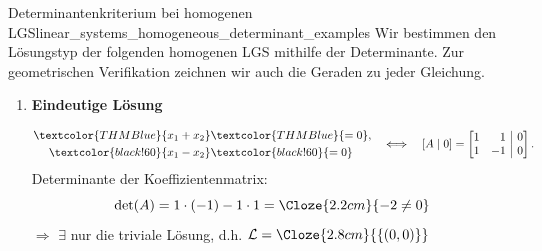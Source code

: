 \begin{ExampleBox}{Determinantenkriterium bei homogenen LGS}{linear_systems_homogeneous_determinant_examples}
  Wir bestimmen den Lösungstyp der folgenden homogenen LGS mithilfe der
  Determinante. Zur geometrischen Verifikation zeichnen wir auch die Geraden
  zu jeder Gleichung.

  \begin{enumerate}[label=\alph*),leftmargin=1.8em,itemsep=1.5em]
    \item
      \textbf{Eindeutige Lösung}\par
      \noindent
      \begin{minipage}[c]{0.61\linewidth}
        \vspace{-0.45\baselineskip}
        \[
          \begin{aligned}
            \textcolor{THMBlue}{x_1+x_2}&\textcolor{THMBlue}{=0},\\
            \textcolor{black!60}{x_1-x_2}&\textcolor{black!60}{=0}
          \end{aligned}
          \quad\Longleftrightarrow\quad
          [A\mid 0]=
          \left[
            \begin{array}{@{}rr|r@{}}
              1& 1&0\\
              1&-1&0
            \end{array}
          \right].
        \]
        \noindent
        Determinante der Koeffizientenmatrix:
        \[
          \det(A)=1\cdot(-1)-1\cdot1
          =\Cloze{2.2cm}{-2\neq0}
        \]
        \noindent
        $\Longrightarrow$\quad
        $\exists$ nur die triviale Lösung, d.h. $\mathcal L=\Cloze{2.8cm}{\{(0,0)\}}$
      \end{minipage}\hfill
      \begin{minipage}[c]{0.34\linewidth}
        \centering
      \end{minipage}


\end{enumerate}
\end{ExampleBox}
